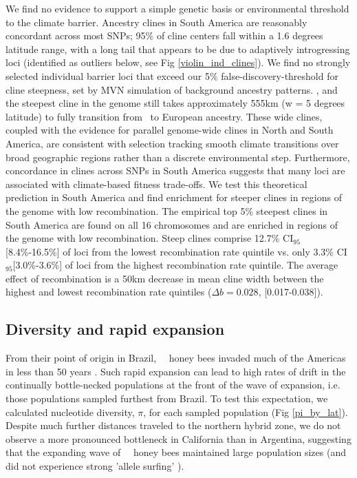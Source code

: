 We find no evidence to support a simple genetic basis or environmental threshold to the climate barrier. Ancestry clines in South America are reasonably concordant across most SNPs; 95\% of cline centers fall within a 1.6 degrees latitude range, with a long tail that appears to be due to adaptively introgressing loci (identified as outliers below, see Fig \ref{violin_ind_clines}). We find no strongly selected individual barrier loci that exceed our 5\% false-discovery-threshold for cline steepness, set by MVN simulation of background ancestry patterns. , and the steepest cline in the genome still takes approximately 555km (w = 5 degrees latitude) to fully transition from \scutellata\ to European ancestry. These wide clines, coupled with the evidence for parallel genome-wide clines in North and South America, are consistent with selection tracking smooth climate transitions over broad geographic regions rather than a discrete environmental step. Furthermore, concordance in clines across SNPs in South America suggests that many loci are associated with climate-based fitness trade-offs.
 We test this theoretical prediction in South America and find enrichment for steeper clines in regions of the genome with low recombination. The empirical top 5\% steepest clines in South America are found on all 16 chromosomes and are enriched in regions of the genome with low recombination. Steep clines comprise 12.7\% CI$_{95}$[8.4\%-16.5\%] of loci from the lowest recombination rate quintile vs. only 3.3\% CI$_{95}$[3.0\%-3.6\%] of loci from the highest recombination rate quintile. The average effect of recombination is a 50km decrease in mean cline width between the highest and lowest recombination rate quintiles ($\Delta b = 0.028$, [0.017-0.038]).

\subsection*{Diversity and rapid expansion}
From their point of origin in Brazil, \africanized\ \hyb\ honey bees invaded much of the Americas in less than 50 years \cite{Schneider:2004fe}. Such rapid expansion can lead to high rates of drift in the continually bottle-necked populations at the front of the wave of expansion, i.e. those populations sampled furthest from Brazil. To test this expectation, we calculated nucleotide diversity, $\pi$, for each sampled population (Fig \ref{pi_by_lat}). Despite much further distances traveled to the northern hybrid zone, we do not observe a more pronounced bottleneck in California than in Argentina, suggesting that the expanding wave of \africanized\ \hyb\ honey bees maintained large population sizes (and did not experience strong 'allele surfing' \cite{Excoffier:2009em}).

